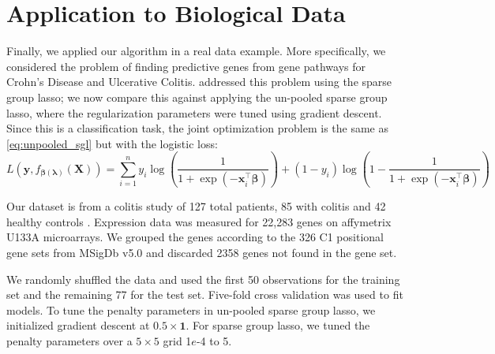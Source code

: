 \documentclass[12pt]{article}
\begin{document}
\section{Application to Biological Data}\label{realDataResults}
Finally, we applied our algorithm in a real data example. More specifically, we considered the problem of finding predictive genes from gene pathways for Crohn's Disease and Ulcerative Colitis. \citet{simon2013sparse} addressed this problem using the sparse group lasso; we now compare this against applying the un-pooled sparse group lasso, where the regularization parameters were tuned using gradient descent. Since this is a classification task, the joint optimization problem is the same as \eqref{eq:unpooled_sgl} but with the logistic loss:
\begin{equation}
L\left ( \boldsymbol{y}, f_{\boldsymbol \beta(\boldsymbol\lambda)}(\boldsymbol{X}) \right ) = \sum_{i=1}^{n} y_{i} \log \left ( \frac{1}{1+\exp(-\boldsymbol x_{i}^\top \boldsymbol \beta)} \right ) + (1- y_i)\log \left (1 - \frac{1}{1+\exp(-\boldsymbol x_i^\top \boldsymbol \beta)} \right)
\end{equation}

Our dataset is from a colitis study of 127 total patients, 85 with colitis and 42 healthy controls \citep{burczynski2006molecular}. Expression data was measured for 22,283 genes on affymetrix U133A microarrays. We grouped the genes according to the 326 C1 positional gene sets from MSigDb v5.0 \citep{subramanian2005gene} and discarded 2358 genes not found in the gene set.

We randomly shuffled the data and used the first 50 observations for the training set and the remaining 77 for the test set. Five-fold cross validation was used to fit models. To tune the penalty parameters in un-pooled sparse group lasso, we initialized gradient descent at $0.5 \times \boldsymbol 1$. For sparse group lasso, we tuned the penalty parameters over a $5 \times 5$ grid 1$e$-4 to 5.
\end{document}

